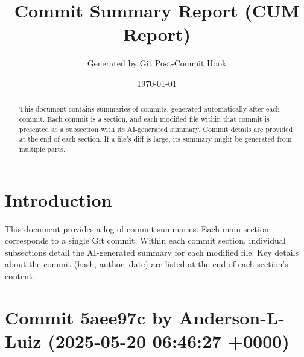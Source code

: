 \documentclass{article}
\title{Commit Summary Report (CUM Report)}
\author{Generated by Git Post-Commit Hook}
\date{\today}
\begin{document}
\maketitle
\begin{abstract}
This document contains summaries of commits, generated automatically after each commit. Each commit is a section, and each modified file within that commit is presented as a subsection with its AI-generated summary. Commit details are provided at the end of each section. If a file's diff is large, its summary might be generated from multiple parts.
\end{abstract}
\tableofcontents
\newpage

\section{Introduction}
This document provides a log of commit summaries. Each main section corresponds to a single Git commit. Within each commit section, individual subsections detail the AI-generated summary for each modified file. Key details about the commit (hash, author, date) are listed at the end of each section's content.
\section{Commit 5aee97c by Anderson-L-Luiz (2025-05-20 06:46:27 +0000)}
\end{document}
